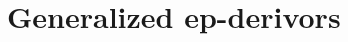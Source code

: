 \documentclass{amsart}
\newcommand{\mor}{\usebox{\xymor}}    %
\theoremstyle{plain}
\newtheorem{remark}[theorem]{Remark}
\theoremstyle{definition}
\begin{document}
%
%
%

\section{Generalized ep-derivors}\label{SGenEpDerivors}
\end{document}
